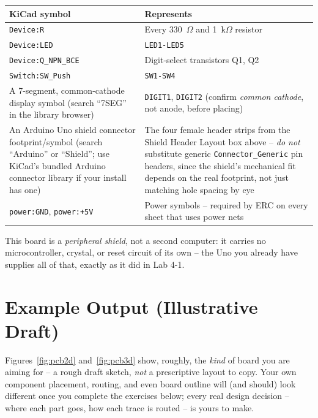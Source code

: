 \documentclass[11pt]{article}
\begin{document}
\begin{summary}
\begin{center}
\begin{tabular}{@{}p{4.5cm}p{9.7cm}@{}}
\toprule
\textbf{KiCad symbol} & \textbf{Represents} \\
\midrule
\texttt{Device:R} & Every 330~$\Omega$ and 1~k$\Omega$ resistor \\
\texttt{Device:LED} & \texttt{LED1-LED5} \\
\texttt{Device:Q\_NPN\_BCE} & Digit-select transistors Q1, Q2 \\
\texttt{Switch:SW\_Push} & \texttt{SW1-SW4} \\
A 7-segment, common-cathode display symbol (search ``7SEG'' in the library
browser) & \texttt{DIGIT1}, \texttt{DIGIT2} (confirm \emph{common cathode}, not
anode, before placing) \\
An Arduino Uno shield connector footprint/symbol (search ``Arduino'' or
``Shield''; use KiCad's bundled Arduino connector library if your install has
one) & The four female header strips from the Shield Header Layout box above --
\emph{do not} substitute generic \texttt{Connector\_Generic} pin headers, since
the shield's mechanical fit depends on the real footprint, not just matching
hole spacing by eye \\
\texttt{power:GND}, \texttt{power:+5V} & Power symbols -- required by ERC on every
sheet that uses power nets \\
\bottomrule
\end{tabular}
\end{center}
This board is a \emph{peripheral shield}, not a second computer: it carries no
microcontroller, crystal, or reset circuit of its own -- the Uno you already have
supplies all of that, exactly as it did in Lab 4-1.
\end{summary}

\section*{Example Output (Illustrative Draft)}
Figures~\ref{fig:pcb2d} and~\ref{fig:pcb3d} show, roughly, the \emph{kind} of board
you are aiming for -- a rough draft sketch, \emph{not} a prescriptive layout to
copy. Your own component placement, routing, and even board outline will (and
should) look different once you complete the exercises below; every real design
decision -- where each part goes, how each trace is routed -- is yours to make.
\end{document}
